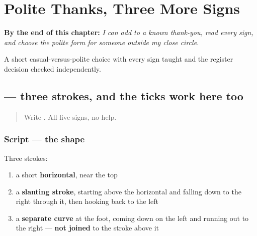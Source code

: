 
\chapter{Polite Thanks, Three More Signs}
\label{ch:ja-polite-thanks}

\begin{chapteropening}
\textbf{By the end of this chapter:} \emph{I can add  to a known thank-you, read every sign, and choose the polite form for someone outside my close circle.}

A short casual-versus-polite choice with every sign taught and the register decision checked independently.
\end{chapteropening}

\section[\texorpdfstring{\ja{さ} (sa)}{さ (sa)}]{ — three strokes, and the ticks work here too}

\label{lesson:JA-W03-sa}



\begin{quote}
Write . All five signs, no help.
\end{quote}

\subsection*{Script — the shape}

\begin{quote}
\end{quote}

Three strokes:

\begin{enumerate}
\raggedright
  \item a short \textbf{horizontal}, near the top
  \item a \textbf{slanting stroke}, starting above the horizontal and falling down to the right through it, then hooking back to the left
  \item a \textbf{separate curve} at the foot, coming down on the left and running out to the right — \textbf{not joined} to the stroke above it
\end{enumerate}

